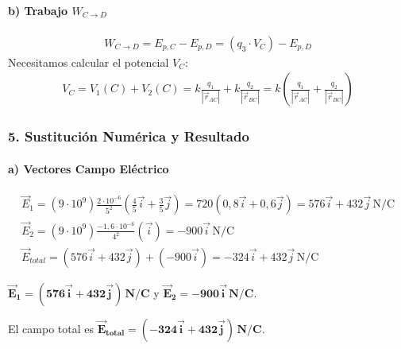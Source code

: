 \paragraph*{b) Trabajo $W_{C \to D}$}
\begin{gather}
    W_{C \to D} = E_{p,C} - E_{p,D} = (q_3 \cdot V_C) - E_{p,D}
\end{gather}
Necesitamos calcular el potencial $V_C$:
\begin{gather}
    V_C = V_1(C) + V_2(C) = k \frac{q_1}{|\vec{r}_{AC}|} + k \frac{q_2}{|\vec{r}_{BC}|} = k \left( \frac{q_1}{|\vec{r}_{AC}|} + \frac{q_2}{|\vec{r}_{BC}|} \right)
\end{gather}

\subsubsection*{5. Sustitución Numérica y Resultado}
\paragraph*{a) Vectores Campo Eléctrico}
\begin{gather}
    \vec{E}_1 = (9\cdot10^9) \frac{2\cdot10^{-6}}{5^2} \left(\frac{4}{5}\vec{i} + \frac{3}{5}\vec{j}\right) = 720 (0,8\vec{i} + 0,6\vec{j}) = 576\vec{i} + 432\vec{j} \, \text{N/C} \\
    \vec{E}_2 = (9\cdot10^9) \frac{-1,6\cdot10^{-6}}{4^2} (\vec{i}) = -900\vec{i} \, \text{N/C} \\
    \vec{E}_{total} = (576\vec{i} + 432\vec{j}) + (-900\vec{i}) = -324\vec{i} + 432\vec{j} \, \text{N/C}
\end{gather}
\begin{cajaresultado}
    $\boldsymbol{\vec{E}_1 = (576\vec{i} + 432\vec{j}) \, \textbf{N/C}}$ y $\boldsymbol{\vec{E}_2 = -900\vec{i} \, \textbf{N/C}}$.
\end{cajaresultado}
\begin{cajaresultado}
    El campo total es $\boldsymbol{\vec{E}_{total} = (-324\vec{i} + 432\vec{j}) \, \textbf{N/C}}$.
\end{cajaresultado}

